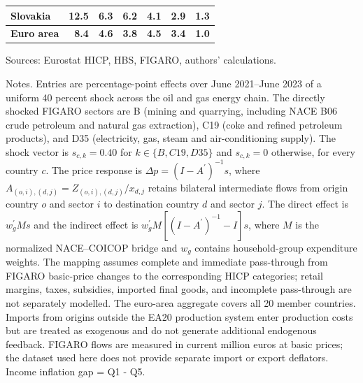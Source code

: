 \documentclass[11pt]{article}
\begin{document}
\begin{table}[H]
\begin{tabular}{lrrrrrr}
Slovakia & 12.5 & 6.3 & 6.2 & 4.1 & 2.9 & 1.3
 \\
\midrule
\textbf{Euro area} & \textbf{8.4} & \textbf{4.6} & \textbf{3.8} & \textbf{4.5} & \textbf{3.4} & \textbf{1.0}
 \\
\bottomrule
\end{tabular}
\par\vspace{0.35em}\footnotesize\noindent Sources: Eurostat HICP, HBS, FIGARO, authors' calculations.
\par\vspace{0.25em}\footnotesize\noindent Notes. Entries are percentage-point effects over June 2021--June 2023 of a uniform 40 percent shock across the oil and gas energy chain. The directly shocked FIGARO sectors are B (mining and quarrying, including NACE B06 crude petroleum and natural gas extraction), C19 (coke and refined petroleum products), and D35 (electricity, gas, steam and air-conditioning supply). The shock vector is $s_{c,k}=0.40$ for $k\in\{B,C19,D35\}$ and $s_{c,k}=0$ otherwise, for every country $c$. The price response is $\Delta p = (I - A^{\prime})^{-1}s$, where $A_{(o,i),(d,j)}=Z_{(o,i),(d,j)}/x_{d,j}$ retains bilateral intermediate flows from origin country $o$ and sector $i$ to destination country $d$ and sector $j$. The direct effect is $w_g^{\prime}Ms$ and the indirect effect is $w_g^{\prime}M[(I-A^{\prime})^{-1}-I]s$, where $M$ is the normalized NACE--COICOP bridge and $w_g$ contains household-group expenditure weights. The mapping assumes complete and immediate pass-through from FIGARO basic-price changes to the corresponding HICP categories; retail margins, taxes, subsidies, imported final goods, and incomplete pass-through are not separately modelled. The euro-area aggregate covers all 20 member countries. Imports from origins outside the EA20 production system enter production costs but are treated as exogenous and do not generate additional endogenous feedback. FIGARO flows are measured in current million euros at basic prices; the dataset used here does not provide separate import or export deflators. Income inflation gap = Q1 - Q5.
\end{table}
\vspace{0.6em}
\end{document}
